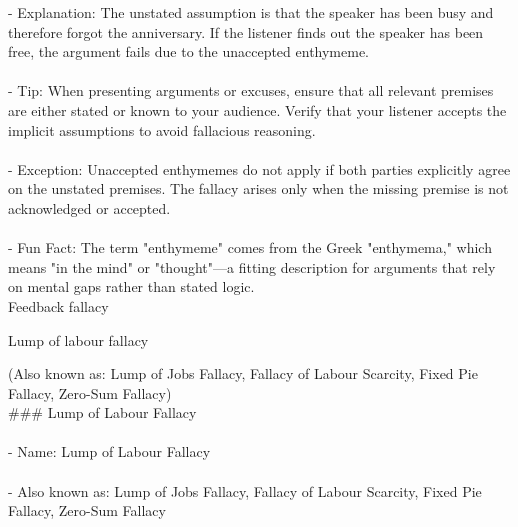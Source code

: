 \documentclass[a4paper,12pt,single,pdftex]{scrartcl}
\begin{document}
    
        - Explanation: The unstated assumption is that the speaker has been busy and therefore forgot the anniversary. If the listener finds out the speaker has been free, the argument fails due to the unaccepted enthymeme. 
    \\

    
      
    \\

    
      - Tip: When presenting arguments or excuses, ensure that all relevant premises are either stated or known to your audience. Verify that your listener accepts the implicit assumptions to avoid fallacious reasoning. 
    \\

    
      
    \\

    
      - Exception: Unaccepted enthymemes do not apply if both parties explicitly agree on the unstated premises. The fallacy arises only when the missing premise is not acknowledged or accepted. 
    \\

    
      
    \\

    
      - Fun Fact: The term "enthymeme" comes from the Greek "enthymema," which means "in the mind" or "thought"—a fitting description for arguments that rely on mental gaps rather than stated logic. 
    \\

  

Feedback fallacy

Lump of labour fallacy
    
      (Also known as: Lump of Jobs Fallacy, Fallacy of Labour Scarcity, Fixed Pie Fallacy, Zero-Sum Fallacy)
    \\

  
    
      \#\#\# Lump of Labour Fallacy
    \\

    
      
    \\

    
      - Name: Lump of Labour Fallacy
    \\

    
      
    \\

    
      - Also known as: Lump of Jobs Fallacy, Fallacy of Labour Scarcity, Fixed Pie Fallacy, Zero-Sum Fallacy
    \\
\end{document}

